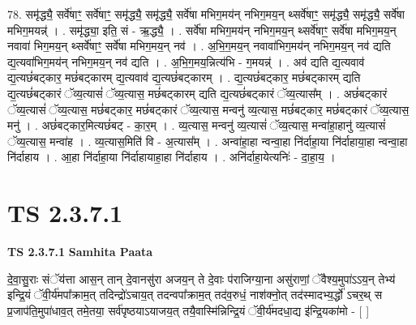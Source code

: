 \documentclass[17pt]{extarticle}
\begin{document}
78. समृ॑द्ध्यै॒ सर्वे॑षाꣳ॒॒ सर्वे॑षाꣳ॒॒ समृ॑द्ध्यै॒ समृ॑द्ध्यै॒ सर्वे॑षा मभिग॒मय॑न् नभिग॒मय॒न् थ्सर्वे॑षाꣳ॒॒ समृ॑द्ध्यै॒ समृ॑द्ध्यै॒ सर्वे॑षा मभिग॒मयन्न्॑ । . समृ॑द्ध्या॒ इति॒ सं - ऋ॒द्ध्यै॒ । . सर्वे॑षा मभिग॒मय॑न् नभिग॒मय॒न् थ्सर्वे॑षाꣳ॒॒ सर्वे॑षा मभिग॒मय॒न् नवावा॑ भिग॒मय॒न् थ्सर्वे॑षाꣳ॒॒ सर्वे॑षा मभिग॒मय॒न् नव॑ । . अ॒भि॒ग॒मय॒न् नवावा॑भिग॒मय॑न् नभिग॒मय॒न् नव॑ द्यति द्य॒त्यवा॑भिग॒मय॑न् नभिग॒मय॒न् नव॑ द्यति । . अ॒भि॒ग॒मय॒न्नित्य॑भि - ग॒मयन्न्॑ । . अव॑ द्यति द्य॒त्यवाव॑ द्य॒त्यछं॑बट्कार॒ मछं॑बट्कारम् द्य॒त्यवाव॑ द्य॒त्यछं॑बट्कारम् । . द्य॒त्यछं॑बट्कार॒ मछं॑बट्कारम् द्यति द्य॒त्यछं॑बट्कारं ॅव्य॒त्यासं॑ ॅव्य॒त्यास॒ मछं॑बट्कारम् द्यति द्य॒त्यछं॑बट्कारं ॅव्य॒त्यास᳚म् । . अछं॑बट्कारं ॅव्य॒त्यासं॑ ॅव्य॒त्यास॒ मछं॑बट्कार॒ मछं॑बट्कारं ॅव्य॒त्यास॒ मन्वनु॑ व्य॒त्यास॒ मछं॑बट्कार॒ मछं॑बट्कारं ॅव्य॒त्यास॒ मनु॑ । . अछं॑बट्कार॒मित्यछं॑बट् - का॒र॒म् । . व्य॒त्यास॒ मन्वनु॑ व्य॒त्यासं॑ ॅव्य॒त्यास॒ मन्वा॑हा॒हानु॑ व्य॒त्यासं॑ ॅव्य॒त्यास॒ मन्वा॑ह । . व्य॒त्यास॒मिति॑ वि - अ॒त्यास᳚म् । . अन्वा॑हा॒हा न्वन्वा॒हा नि॑र्दाहा॒या नि॑र्दाहाया॒हा न्वन्वा॒हा नि॑र्दाहाय । . आ॒हा नि॑र्दाहा॒या नि॑र्दाहायाहा॒हा नि॑र्दाहाय । . अनि॑र्दाहा॒येत्यनिः॑ - दा॒हा॒य॒ । \newline
\pagebreak
{}
\section*{ TS 2.3.7.1 }

\textbf{TS 2.3.7.1 } \newline
\textbf{Samhita Paata} \newline

दे॒वा॒सु॒राः संॅय॑त्ता आस॒न् तान् दे॒वानसु॑रा अजय॒न् ते दे॒वाः प॑राजिग्या॒ना असु॑राणां॒ ॅवैश्य॒मुपा॑ऽऽय॒न् तेभ्य॑ इन्द्रि॒यं ॅवी॒र्य॑मपा᳚क्राम॒त् तदिन्द्रो॑ऽचाय॒त् तदन्वपा᳚क्राम॒त् तद॑व॒रुधं॒ नाश॑क्नो॒त् तद॑स्मादभ्य॒र्द्धो॑ ऽचर॒थ् स प्र॒जाप॑ति॒मुपा॑धाव॒त् तमे॒तया॒ सर्व॑पृष्ठयाऽयाजय॒त् तयै॒वास्मि॑न्निन्द्रि॒यं ॅवी॒र्य॑मदधा॒द्य इ॑न्द्रि॒यका॑मो - [  ] \newline
\end{document}
